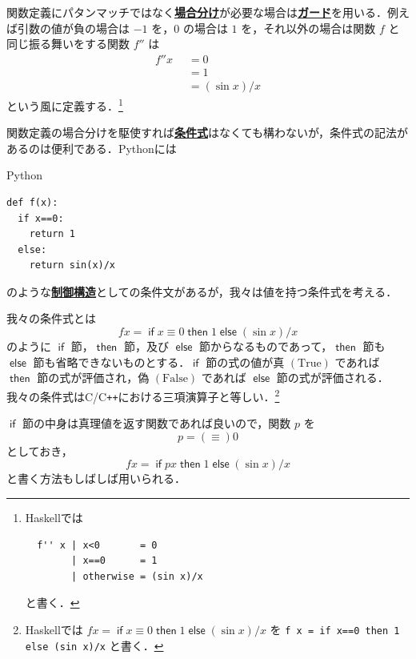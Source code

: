\documentclass[a4paper,twocolumn]{jsbook}
\newcommand{\programminglanguage}[1]{\textsf{#1}}
\newcommand{\clang}{\programminglanguage{C}}
\newcommand{\cxx}{\programminglanguage{C}\texttt{++}}
\newcommand{\haskell}{\programminglanguage{Haskell}}
\newcommand{\python}{\programminglanguage{Python}}
\newcommand{\keyword}[1]{{\underline{\textbf{#1}}}}
\newcommand{\code}[1]{\texttt{#1}}
\newenvironment{pythoncode}{\begin{itembox}[r]{\python}}{\end{itembox}}
\newcommand{\mKeyword}[1]{\mathsf{#1}} %
\newcommand{\mIfKeyword}{\mKeyword{if}}
\newcommand{\mElseKeyword}{\mKeyword{else}}
\newcommand{\mOtherwiseKeyword}{\mKeyword{otherwise}}
\newcommand{\mThenKeyword}{\mKeyword{then}}
\DeclareMathOperator{\mElse}{\mElseKeyword}
\DeclareMathOperator{\mIf}{\mIfKeyword}
\DeclareMathOperator{\mOtherwise}{\mOtherwiseKeyword}
\DeclareMathOperator{\mThen}{\mThenKeyword}
\newcommand{\mSpecialConst}[1]{\mathrm{#1}} %
\newcommand{\mFalse}{\mSpecialConst{False}}
\newcommand{\mTrue}{\mSpecialConst{True}}
\newcommand{\mGuard}[1]{\mathop{\mid_{#1}}}
\newcommand{\mIfThenElse}[3]{\mIf{#1}\mThen{#2}\mElse{#3}}
\begin{document}
関数定義にパタンマッチではなく\keyword{場合分け}が必要な場合は\keyword{ガード}を用いる．例えば引数の値が負の場合は $-1$ を，$0$ の場合は $1$ を，それ以外の場合は関数 $f$ と同じ振る舞いをする関数 $f''$ は
\begin{equation}
\begin{split}
f''x&\mGuard{x<0}=0\\
&\mGuard{x\equiv 0}=1\\
&\mGuard{\mOtherwise}=(\sin x)/x
\end{split}
\end{equation}
という風に定義する．\footnote{\haskell では
\begin{verbatim}
  f'' x | x<0       = 0
        | x==0      = 1
        | otherwise = (sin x)/x
\end{verbatim}
と書く．}



関数定義の場合分けを駆使すれば\keyword{条件式}はなくても構わないが，条件式の記法があるのは便利である．\python には
\begin{pythoncode}
\begin{verbatim}
def f(x):
  if x==0:
    return 1
  else:
    return sin(x)/x
\end{verbatim}
\end{pythoncode}
のような\keyword{制御構造}としての条件文があるが，我々は値を持つ条件式を考える．

我々の条件式とは
\begin{equation}
fx
=\mIfThenElse{x\equiv0}{1}{{}(\sin x)/x}
\end{equation}
のように $\mIf$ 節，$\mThen$ 節，及び $\mElse$ 節からなるものであって，$\mThen$ 節も $\mElse$ 節も省略できないものとする．$\mIf$ 節の式の値が真 $(\mTrue)$ であれば $\mThen$ 節の式が評価され，偽 $(\mFalse)$ であれば $\mElse$ 節の式が評価される．我々の条件式は\clang/\cxx における三項演算子と等しい．\footnote{\haskell では $fx=\mIfThenElse{x\equiv0}{1}{{}(\sin x)/x}$ を \code{f x = if x==0 then 1 else (sin x)/x} と書く．}

$\mIf$ 節の中身は真理値を返す関数であれば良いので，関数 $p$ を
\begin{equation}
p=(\equiv)0
\end{equation}
としておき，
\begin{equation}
fx=\mIfThenElse{px}{1}{{}(\sin x)/x}
\end{equation}
と書く方法もしばしば用いられる．
\end{document}
